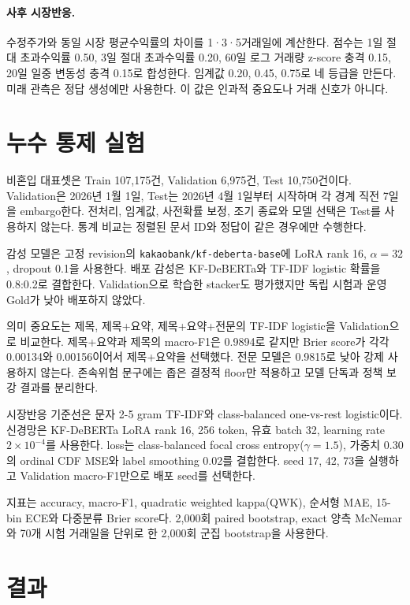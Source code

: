 \documentclass[10pt,a4paper,twocolumn]{article}
\begin{document}
\paragraph{사후 시장반응.} 수정주가와 동일 시장 평균수익률의 차이를 1·3·5거래일에 계산한다. 점수는 1일 절대 초과수익률 0.50, 3일 절대 초과수익률 0.20, 60일 로그 거래량 z-score 충격 0.15, 20일 일중 변동성 충격 0.15로 합성한다. 임계값 0.20, 0.45, 0.75로 네 등급을 만든다. 미래 관측은 정답 생성에만 사용한다. 이 값은 인과적 중요도나 거래 신호가 아니다.

\section{누수 통제 실험}

비혼입 대표셋은 Train 107,175건, Validation 6,975건, Test 10,750건이다. Validation은 2026년 1월 1일, Test는 2026년 4월 1일부터 시작하며 각 경계 직전 7일을 embargo한다. 전처리, 임계값, 사전확률 보정, 조기 종료와 모델 선택은 Test를 사용하지 않는다. 통계 비교는 정렬된 문서 ID와 정답이 같은 경우에만 수행한다.

감성 모델은 고정 revision의 \texttt{kakaobank/kf-deberta-base}에 LoRA rank 16, $\alpha=32$, dropout 0.1을 사용한다. 배포 감성은 KF-DeBERTa와 TF-IDF logistic 확률을 0.8:0.2로 결합한다. Validation으로 학습한 stacker도 평가했지만 독립 시험과 운영 Gold가 낮아 배포하지 않았다.

의미 중요도는 제목, 제목+요약, 제목+요약+전문의 TF-IDF logistic을 Validation으로 비교한다. 제목+요약과 제목의 macro-F1은 0.9894로 같지만 Brier score가 각각 0.00134와 0.00156이어서 제목+요약을 선택했다. 전문 모델은 0.9815로 낮아 강제 사용하지 않는다. 존속위험 문구에는 좁은 결정적 floor만 적용하고 모델 단독과 정책 보강 결과를 분리한다.

시장반응 기준선은 문자 2-5 gram TF-IDF와 class-balanced one-vs-rest logistic이다. 신경망은 KF-DeBERTa LoRA rank 16, 256 token, 유효 batch 32, learning rate $2\times10^{-4}$를 사용한다. loss는 class-balanced focal cross entropy($\gamma=1.5$), 가중치 0.30의 ordinal CDF MSE와 label smoothing 0.02를 결합한다. seed 17, 42, 73을 실행하고 Validation macro-F1만으로 배포 seed를 선택한다.

지표는 accuracy, macro-F1, quadratic weighted kappa(QWK), 순서형 MAE, 15-bin ECE와 다중분류 Brier score다. 2,000회 paired bootstrap, exact 양측 McNemar와 70개 시험 거래일을 단위로 한 2,000회 군집 bootstrap을 사용한다.

\section{결과}
\end{document}
